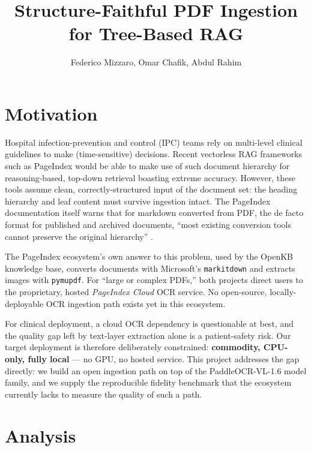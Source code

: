 \documentclass[11pt, a4paper]{article}
\title{\textbf{Structure-Faithful PDF Ingestion for Tree-Based RAG}}
\author{Federico Mizzaro, Omar Chafik, Abdul Rahim}
\begin{document}
\maketitle

\section*{Motivation}

Hospital infection-prevention and control (IPC) teams rely on
multi-level clinical guidelines to make (time-sensitive) decisions.
Recent vectorless RAG frameworks such as PageIndex\cite{zhang} would be
able to make use of such document hierarchy for reasoning-based,
top-down retrieval boasting extreme accuracy\cite{benchmark}.  However,
these tools assume clean, correctly-structured input of the document
set: the heading hierarchy and leaf content must survive ingestion
intact. The PageIndex documentation itself warns that for markdown
converted from PDF, the de facto format for published and archived
documents, ``most existing conversion tools cannot preserve the original
hierarchy'' \cite{pageindexrepo}.

The PageIndex ecosystem's own answer to this problem, used by the OpenKB
knowledge base\cite{openkb}, converts documents with Microsoft's
\texttt{markitdown} and extracts images with \texttt{pymupdf}. For
``large or complex PDFs,'' both projects direct users to the
proprietary, hosted \emph{PageIndex Cloud} OCR service. No open-source,
locally-deployable OCR ingestion path exists yet in this ecosystem.

For clinical deployment, a cloud OCR dependency is questionable at best,
and the quality gap left by text-layer extraction alone is a
patient-safety risk. Our target deployment is therefore deliberately
constrained: \textbf{commodity, CPU-only, fully local} --- no GPU, no
hosted service. This project addresses the gap directly: we build an
open ingestion path on top of the PaddleOCR-VL-1.6 \cite{paddle} model
family, and we supply the reproducible fidelity benchmark that the
ecosystem currently lacks to measure the quality of such a path.

\section*{Analysis}
\end{document}

